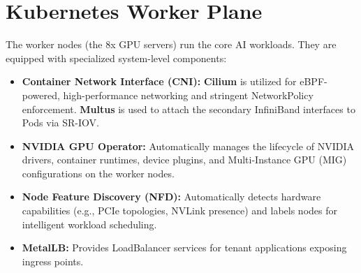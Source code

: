 \section{Kubernetes Worker Plane}
The worker nodes (the 8x GPU servers) run the core AI workloads. They are equipped with specialized system-level components:
\begin{itemize}
    \item \textbf{Container Network Interface (CNI):} \textbf{Cilium} is utilized for eBPF-powered, high-performance networking and stringent NetworkPolicy enforcement. \textbf{Multus} is used to attach the secondary InfiniBand interfaces to Pods via SR-IOV.
    \item \textbf{NVIDIA GPU Operator:} Automatically manages the lifecycle of NVIDIA drivers, container runtimes, device plugins, and Multi-Instance GPU (MIG) configurations on the worker nodes.
    \item \textbf{Node Feature Discovery (NFD):} Automatically detects hardware capabilities (e.g., PCIe topologies, NVLink presence) and labels nodes for intelligent workload scheduling.
    \item \textbf{MetalLB:} Provides LoadBalancer services for tenant applications exposing ingress points.
\end{itemize}
